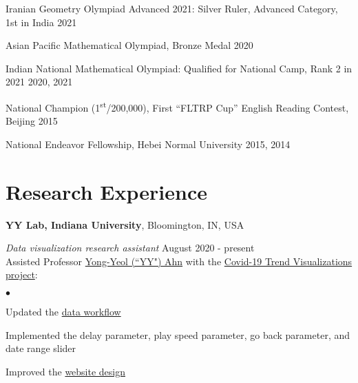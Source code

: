 \documentclass[margin,line, 10pt]{res}
\newenvironment{list2}{
  \begin{list}{$\bullet$}{%
      \setlength{\itemsep}{0in}
      \setlength{\parsep}{0in} \setlength{\parskip}{0in}
      \setlength{\topsep}{0in} \setlength{\partopsep}{0in} 
      \setlength{\leftmargin}{0.2in}}}{\end{list}}
\begin{document}
\begin{resume}
\vspace*{-2.5mm}
Iranian Geometry Olympiad Advanced 2021: Silver Ruler, Advanced Category, 1st in India \hfill 2021

\vspace*{-2.5mm}
Asian Pacific Mathematical Olympiad, Bronze Medal \hfill 2020

\vspace*{-2.5mm}
Indian National Mathematical Olympiad: Qualified for National Camp, Rank 2 in 2021 \hfill 2020, 2021

\vspace*{-2.5mm}
\hspace{-2em} \faTrophy \hspace{.5em} National Champion (1\textsuperscript{st}/200,000), First ``FLTRP Cup” English Reading Contest, Beijing \hfill 2015

\vspace*{-2.5mm}
National Endeavor Fellowship, Hebei Normal University \hfill 2015, 2014

\section{\sc Research Experience}
{\bf YY Lab, Indiana University}, Bloomington, IN, USA

\vspace{-.3cm}
{\em Data visualization research assistant} \hfill { August 2020 - present}\\
Assisted Professor \href{http://yongyeol.com/}{Yong-Yeol (``YY") Ahn} with the \href{https://yyahn.com/covid19-dashboard/}{Covid-19 Trend Visualizations project}:

\vspace*{.05in}  
\begin{list2}
\item Updated the \href{https://github.com/covid19-data/covid19-data}{data workflow}
\item Implemented the delay parameter, play speed parameter, go back parameter, and date range slider
\item Improved the \href{https://github.com/covid19-data/covid19-dashboard}{website design}
\end{list2}


\end{resume}
\end{document}
